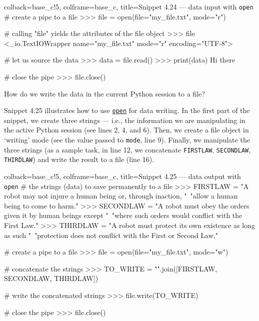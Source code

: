 \documentclass[a4paper,11pt]{book}
\numberwithin{figure}{chapter}
\numberwithin{table}{chapter}
\newcommand{\question}[1]{%
    \begin{tcolorbox}[colback=comp_c!10,colframe=comp_c,sidebyside align=top,width=\linewidth,before skip=1ex]
        #1
    \end{tcolorbox}
    \switchcolumn%
}
\newcommand{\note}[1]{%
    \begin{tcolorbox}[colback=white!0,colframe=white!10,width=\linewidth,before skip=1ex]
        #1
    \end{tcolorbox}
}
\begin{document}
\begin{pythoncode}[linenos=true,]{colback=base_c!5, colframe=base_c, title=\sffamily Snippet 4.24 --- data input with \texttt{open}}
# create a pipe to a file
>>> file = open(file="my_file.txt", mode="r")

# calling "file" yields the attributes of the file object
>>> file
<_io.TextIOWrapper name="my_file.txt" mode="r" encoding="UTF-8">

# let us source the data
>>> data = file.read()
>>> print(data)
Hi there

# close the pipe
>>> file.close()
\end{pythoncode}
\clearpage 

\begin{paracol}{2}
\question{\raggedright How do we write the data in the current Python session to a file?}
\note{Snippet 4.25 illustrates how to use \href{https://docs.python.org/3/library/functions.html\#open}{\texttt{open}} for data writing. In the first part of the snippet, we create three strings --- i.e., the information we are manipulating in the active Python session (see lines 2, 4, and 6). Then, we create a file object in `writing' mode (see the value passed to \texttt{mode}, line 9). Finally, we manipulate the three strings (as a sample task, in line 12, we concatenate \texttt{FIRSTLAW}, \texttt{SECONDLAW}, \texttt{THIRDLAW}) and write the result to a file (line 16).}
\end{paracol}

\begin{pythoncode}[linenos=true,]{colback=base_c!5, colframe=base_c, title=\sffamily Snippet 4.25 --- data output with \texttt{open}}
# the strings (data) to save permanently to a file
>>> FIRSTLAW = "A robot may not injure a human being or, through inaction, "\
	       "allow a human being to come to harm."
>>> SECONDLAW = "A robot must obey the orders given it by human beings except "\
	       "where such orders would conflict with the First Law."
>>> THIRDLAW = "A robot must protect its own existence as long as such "\
               "protection does not conflict with the First or Second Law."

# create a pipe to a file
>>> file = open(file="my_file.txt", mode="w")

# concatenate the strings
>>> TO_WRITE = "\n".join([FIRSTLAW, SECONDLAW, THIRDLAW])

# write the concatenated strings 
>>> file.write(TO_WRITE)

# close the pipe
>>> file.close()
\end{pythoncode}
	
\end{document}
